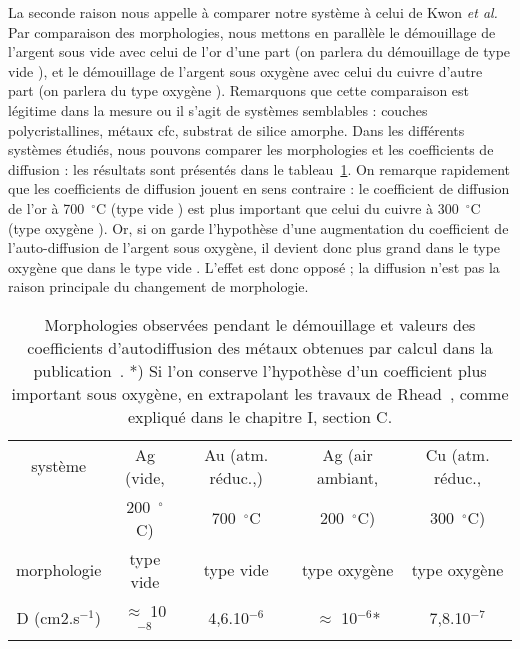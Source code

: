 La seconde raison nous appelle à comparer notre système à celui de Kwon \textit{et al.}~\cite{kwon2003comparison} Par comparaison des morphologies, nous mettons en parallèle le démouillage de l'argent sous vide avec celui de l'or d'une part (on parlera du démouillage de type \og vide \fg), et le démouillage de l'argent sous oxygène avec celui du cuivre d'autre part (on parlera du type \og oxygène \fg). Remarquons que cette comparaison est légitime dans la mesure ou il s'agit de systèmes semblables : couches polycristallines, métaux cfc, substrat de silice amorphe. Dans les différents systèmes étudiés, nous pouvons comparer les morphologies et les coefficients de diffusion : les résultats sont présentés dans le tableau~\ref{tDiffusionIV}. On remarque rapidement que les coefficients de diffusion jouent en sens contraire : le coefficient de diffusion de l'or à 700~$^\circ$C (type \og vide \fg) est plus important que celui du cuivre à 300~$^\circ$C (type \og oxygène \fg). Or, si on garde l'hypothèse d'une augmentation du coefficient de l'auto-diffusion de l'argent sous oxygène, il devient donc plus grand dans le type \og oxygène \fg{} que dans le type \og vide \fg. L'effet est donc opposé ; la diffusion n'est pas la raison principale du changement de morphologie.\par 
{}
\begin{table}
\centering
\begin{tabular}{ccccc}
\hline
système & Ag (vide, & Au (atm. réduc.,) & Ag (air ambiant, & Cu (atm. réduc.,\\
\hspace{1pt} &  200~$^\circ$C)&  700~$^\circ$C &  200~$^\circ$C) &  300~$^\circ$C)\\
\hline
morphologie & type vide & type vide & type oxygène & type oxygène\\
D (cm2.s$^{-1}$) &  $\approx$ 10$^{-8}$ & 4,6.10$^{-6}$ & $\approx$ 10$^{-6}$* & 7,8.10$^{-7}$\\
\hline
\end{tabular}
\caption{Morphologies observées pendant le démouillage et valeurs des coefficients d'autodiffusion des métaux obtenues par calcul dans la publication~\cite{agrawal2002predicting}. *) Si l'on conserve l'hypothèse d'un coefficient plus important sous oxygène, en extrapolant les travaux de Rhead~\cite{rhead1963surface}, comme expliqué dans le chapitre I, section C.}
\label{tDiffusionIV}
\end{table}
